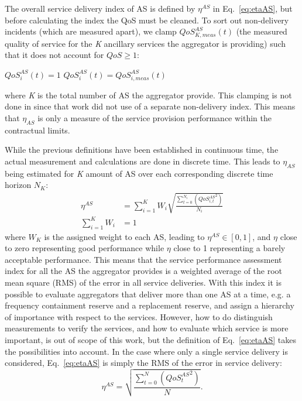 The overall service delivery index of AS is defined by $\eta^{AS}$ in Eq.~\eqref{eq:etaAS}, but before calculating the index the QoS must be cleaned. To sort out non-delivery incidents (which are measured apart), we clamp $QoS_{K,meas}^{AS}(t)$ (the measured quality of service for the \emph{K} ancillary services the aggregator is providing) such that it does not account for $QoS \geq 1$: 
\begin{algorithmic}[H]
        \STATE $QoS_{i}^{AS}(t) = 1$ 
    \ELSE 
        \STATE $QoS_{i}^{AS}(t) = QoS_{i,meas}^{AS}(t)$
    \ENDIF
\ENDFOR
\ENDFOR
\end{algorithmic}
where \emph{K} is the total number of AS the aggregator provide.
This clamping is not done in \cite{bondy2014performance} since that work did not use of a separate non-delivery index. This means that $\eta_{AS}$ is only a measure of the service provision performance within the contractual limits.

While the previous definitions have been established in continuous time, the actual measurement and calculations are done in discrete time. This leads to $\eta_{AS}$ being estimated for \emph{K} amount of AS over each corresponding discrete time horizon $N_K$:
\begin{align}\label{eq:etaAS}
\eta^{AS} &= \sum^{K}_{i=1} W_i \sqrt{\frac{\sum^{N_i}_{t=0} \left( {QoS^{AS}_{i,t}}^{2} \right)}{N_i}}\\
\sum_{i=1}^K W_i &= 1
\end{align}
where $W_K$ is the assigned weight to each AS, leading to $\eta^{AS} \in [0,1]$, and $\eta$ close to zero representing good performance while $\eta$ close to 1 representing a barely acceptable performance. This means that the service performance assessment index for all the AS the aggregator provides is a weighted average of the root mean square (RMS) of the error in all service deliveries. With this index it is possible to evaluate aggregators that deliver more than one AS at a time, e.g. a frequency containment reserve and a replacement reserve, and assign a hierarchy of importance with respect to the services. However, how to do distinguish measurements to verify the services, and how to evaluate which service is more important, is out of scope of this work, but the definition of Eq.~\eqref{eq:etaAS} takes the possibilities into account. In the case where only a single service delivery is considered, Eq.~\eqref{eq:etaAS} is simply the RMS of the error in service delivery:
\begin{equation}\label{eq:etaASsimp}
\eta^{AS} = \sqrt{\frac{\sum^{N}_{t=0} \left( {QoS^{AS}_{t}}^{2} \right)}{N}}.
\end{equation}

